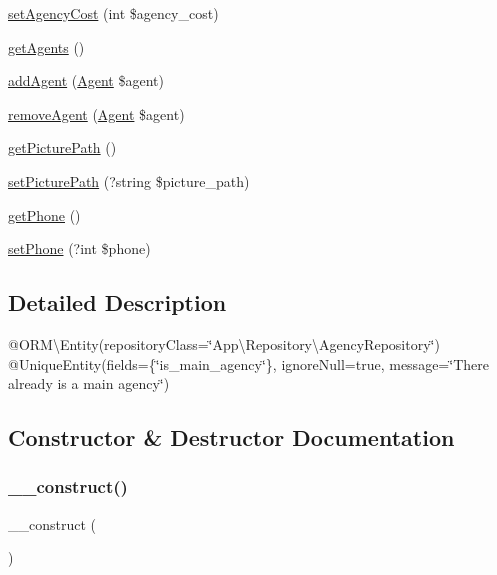 \begin{DoxyCompactItemize}
\item 
\mbox{\hyperlink{class_app_1_1_entity_1_1_agency_a955a2815b38e0559cf3ecf3d21233c67}{set\+Agency\+Cost}} (int \$agency\+\_\+cost)
\item 
\mbox{\hyperlink{class_app_1_1_entity_1_1_agency_af8ff8a6ad7be0182c2db92302bbde674}{get\+Agents}} ()
\item 
\mbox{\hyperlink{class_app_1_1_entity_1_1_agency_af9b4037bde05427fa94e1f3104de6d97}{add\+Agent}} (\mbox{\hyperlink{class_app_1_1_entity_1_1_agent}{Agent}} \$agent)
\item 
\mbox{\hyperlink{class_app_1_1_entity_1_1_agency_a01fc29de78c9b260ee2b5615070e1b0e}{remove\+Agent}} (\mbox{\hyperlink{class_app_1_1_entity_1_1_agent}{Agent}} \$agent)
\item 
\mbox{\hyperlink{class_app_1_1_entity_1_1_agency_a0e6dcd690c9c15acb745272d78e8864a}{get\+Picture\+Path}} ()
\item 
\mbox{\hyperlink{class_app_1_1_entity_1_1_agency_aa5d410c146549ef8cf2afa24785f0d4e}{set\+Picture\+Path}} (?string \$picture\+\_\+path)
\item 
\mbox{\hyperlink{class_app_1_1_entity_1_1_agency_a5e8a94cd59635ac689687849b9f5cd9d}{get\+Phone}} ()
\item 
\mbox{\hyperlink{class_app_1_1_entity_1_1_agency_a0cfc0b6d9728ba31d6f0ebd7eec95bc3}{set\+Phone}} (?int \$phone)
\end{DoxyCompactItemize}


\subsection{Detailed Description}
@\+O\+RM\textbackslash{}\+Entity(repository\+Class=\char`\"{}\+App\textbackslash{}\+Repository\textbackslash{}\+Agency\+Repository\char`\"{}) @\+Unique\+Entity(fields=\{\char`\"{}is\+\_\+main\+\_\+agency\char`\"{}\}, ignore\+Null=true, message=\char`\"{}\+There already is a main agency\char`\"{}) 

\subsection{Constructor \& Destructor Documentation}
\mbox{\label{class_app_1_1_entity_1_1_agency_a095c5d389db211932136b53f25f39685}} 
\subsubsection{\texorpdfstring{\_\_construct()}{\_\_construct()}}
{\footnotesize\ttfamily \+\_\+\+\_\+construct (\begin{DoxyParamCaption}{ }\end{DoxyParamCaption})}

